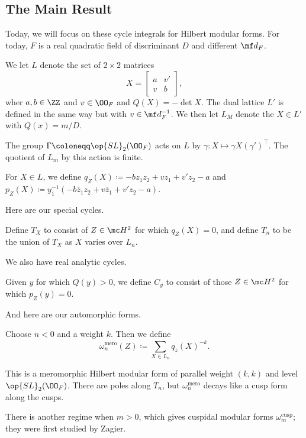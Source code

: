 \documentclass{article}
\begin{document}
\subsection{The Main Result}
Today, we will focus on these cycle integrals for Hilbert modular forms. For today, $F$ is a real quadratic field of discriminant $D$ and different $\mf d_F$.
\begin{notation}
	We let $L$ denote the set of $2\times2$ matrices
	\[X=\begin{bmatrix}
		a & v' \\ v & b
	\end{bmatrix},\]
	wher $a,b\in\ZZ$ and $v\in\OO_F$ and $Q(X)=-\det X$. The dual lattice $L'$ is defined in the same way but with $v\in\mf d_F^{-1}$. We then let $L_M$ denote the $X\in L'$ with $Q(x)=m/D$.
\end{notation}
\begin{remark}
	The group $\Gamma\coloneqq\op{SL}_2(\OO_F)$ acts on $L$ by $\gamma\colon X\mapsto\gamma X(\gamma')^\intercal$. The quotient of $L_m$ by this action is finite.
\end{remark}
\begin{notation}
	For $X\in L$, we define $q_Z(X)\coloneqq-bz_1z_2+vz_1+v'z_2-a$ and $p_Z(X)\coloneqq y_1^{-1}(-b\overline z_1z_2+v\overline z_1+v'z_2-a)$.
\end{notation}
Here are our special cycles.
\begin{notation}
	Define $T_X$ to consist of $Z\in\mc H^2$ for which $q_Z(X)=0$, and define $T_n$ to be the union of $T_X$ as $X$ varies over $L_n$.
\end{notation}
We also have real analytic cycles.
\begin{notation}
	Given $y$ for which $Q(y)>0$, we define $C_y$ to consist of those $Z\in\mc H^2$ for which $p_Z(y)=0$.
\end{notation}
And here are our automorphic forms.
\begin{definition}
	Choose $n<0$ and a weight $k$. Then we define
	\[\omega_n^{\mathrm{mero}}(Z)\coloneqq\sum_{X\in L_n}q_z(X)^{-k}.\]
\end{definition}
\begin{remark}
	This is a meromorphic Hilbert modular form of parallel weight $(k,k)$ and level $\op{SL}_2(\OO_F)$. There are poles along $T_n$, but $\omega_n^{\mathrm{mero}}$ decays like a cusp form along the cusps.
\end{remark}
\begin{remark}
	There is another regime when $m>0$, which gives cuspidal modular forms $\omega_m^{\mathrm{cusp}}$; they were first studied by Zagier.
\end{remark}
\end{document}
